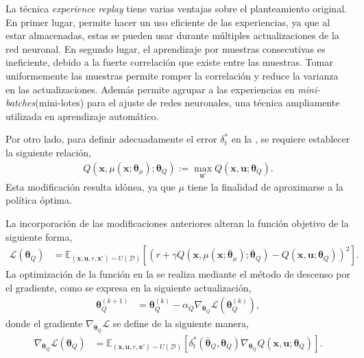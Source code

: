 La técnica \textit{experience replay} tiene varias ventajas sobre el planteamiento original. En primer lugar, permite hacer un uso eficiente de las experiencias, ya que al estar almacenadas, estas se pueden usar durante múltiples actualizaciones de la red neuronal. En segundo lugar, el aprendizaje por muestras consecutivas es ineficiente, debido a la fuerte correlación que existe entre las muestras. Tomar uniformemente las muestras permite romper la correlación y reduce la varianza en las actualizaciones. Además permite agrupar a las experiencias en \textit{mini-batches}(mini-lotes) para el ajuste de redes neuronales, una técnica ampliamente utilizada en aprendizaje automático. \cite{mnih2013}

Por otro lado, para definir adecuadamente el error $\delta_{t}^{*}$ en la , se requiere establecer la siguiente relación,
\begin{align}
    Q(\mathbf{x}, \mu(\mathbf{x};\bm\theta_{\mu}); \bm\theta_{Q}) := \max_{\mathbf{u}'}Q(\mathbf{x}, \mathbf{u}; \bm\theta_{Q}).
\end{align}
Esta modificación resulta idónea, ya que $\mu$ tiene la finalidad de aproximarse a la política óptima.

La incorporación de las modificaciones anteriores alteran la función objetivo de la siguiente forma,
\begin{align}
    \mathcal{L}\left(\bm{\theta}_Q\right) &= \mathbb{E}_{(\mathbf{x}, \mathbf{u}, r, \mathbf{x}')\sim U(\mathcal{D}) }\left[\left(r + \gamma Q\left(\mathbf{x}, \mu\left(\mathbf{x};\bar{\bm\theta}_{\mu}\right); \bar{\bm\theta}_{Q}\right) - Q\left(\mathbf{x}, \mathbf{u};\bm{\theta}_{Q}\right)\right)^2\right].
    \label{eq:ddpg_critic_objective}
\end{align}
La optimización de la función en la  se realiza mediante el método de descenso por el gradiente, como se expresa en la siguiente actualización, 
\begin{align}
    \bm\theta_Q^{(k+1)} &= \bm\theta_{Q}^{(k)} - \alpha_{Q} \nabla_{\bm\theta_Q} \mathcal{L}\left(\bm\theta_Q^{(k)}\right),
    \label{eq:update_Q}
\end{align}
donde el gradiente $\nabla_{\bm\theta_Q}\mathcal{L}$ se define de la siguiente manera,
\begin{align}
\nabla_{\bm\theta_Q}\mathcal{L}(\bm\theta_Q) &= \mathbb{E}_{(\mathbf{x}, \mathbf{u}, r, \mathbf{x}')\sim U(\mathcal{D}) } 
[\delta_{t}^{*}(\bar{\bm\theta}_{Q}, \bm\theta_Q)\nabla_{\bm\theta_Q}Q(\mathbf{x}, \mathbf{u};\bm\theta_Q)].
\label{eq:ddpg_actor_objective}
\end{align}

